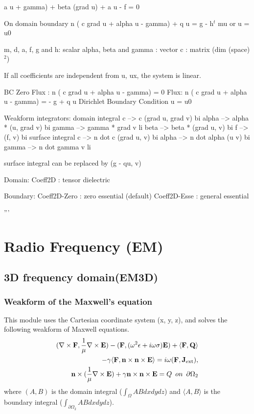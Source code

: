 \documentclass[11pt,a4paper,draft]{report}
\begin{document}
  a u + gamma) 
              + beta (grad u) + a u - f = 0

  On domain boundary
     n ( c grad u + alpha u - gamma) + q u = g - h$^t$ mu
       or 
     u = u0  

    m, d, a, f, g and h: scalar
    alpha, beta and gamma : vector
    c  : matrix (dim (space) $^2$)

    If all coefficients are independent from u, ux,
    the system is linear.

    BC
     Zero Flux : 
        n ( c grad u + alpha u - gamma) = 0
     Flux: 
        n ( c grad u + alpha u - gamma) = - g + q u
     Dirichlet Boundary Condition
        u = u0

  Weakform integrators:
    domain integral
       c     -->  c (grad u, grad v)     bi
       alpha -->  alpha * (u, grad v)    bi
       gamma -->  gamma * grad v         li
       beta  -->  beta * (grad u, v)     bi
       f     -->  (f, v)                 bi
    surface integral
       c     -->   n dot c (grad u, v)   bi
       alpha -->   n dot alpha  (u v)    bi
       gamma -->   n dot gamma   v       li
 
    surface integral can be replaced by (g - qu, v)
        
  Domain:   
     Coeff2D          : tensor dielectric

  Boundary:
     Coeff2D-Zero     : zero essential (default)
     Coeff2D-Esse     : general essential

'''
\section{Radio Frequency (EM)}
\subsection{3D frequency domain(EM3D)}
\subsubsection{Weakform of the Maxwell's equation}
This module uses the Cartesian coordinate system (x, y, z), and solves the following weakform of Maxwell equations. 
 \begin{align}
(\nabla \times \mathbf{F},  \frac{1}{\mu}\nabla  \times  \mathbf{E})
 - (\mathbf{F},  (\omega^2 \epsilon+ i \omega \sigma)  \mathbf{E}) 
 +  \langle \mathbf{F},  \mathbf{Q} \rangle 
 \notag \\
 - \gamma \langle  \mathbf{F}, \mathbf{n} \times \mathbf{n} \times  \mathbf{E}\rangle = i \omega (\mathbf{F}, \mathbf{J}_{\rm ext} ) ,
\label{em3d_weak} \\
 \mathbf{n} \times (\frac{1}{\mu} \nabla \times \mathbf{E}) + \gamma \mathbf{n} \times \mathbf{n} \times  \mathbf{E} = Q\,\,\,on\,\,\,\partial \Omega_{2}
 \end{align}
  where $(A , B)$ is the domain integral ($\int_{\Omega} AB dxdydz$) and $\langle A, B \rangle $ is the boundary integral ($\int_{\partial \Omega_{2}} ABdxdydz$). 
 
\end{document}
